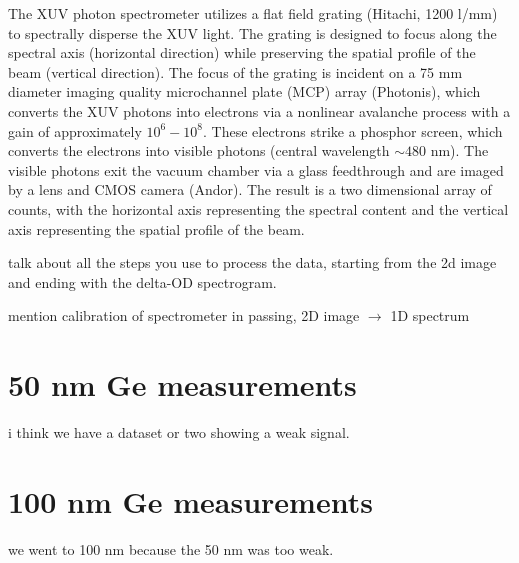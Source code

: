 The XUV photon spectrometer utilizes a flat field grating (Hitachi, 1200 l/mm) to spectrally disperse the XUV light. The grating is designed to focus along the spectral axis (horizontal direction) while preserving the spatial profile of the beam (vertical direction). The focus of the grating is incident on a 75 mm diameter imaging quality microchannel plate (MCP) array (Photonis), which converts the XUV photons into electrons via a nonlinear avalanche process with a gain of approximately $10^6 - 10^8$. These electrons strike a phosphor screen, which converts the electrons into visible photons (central wavelength $\sim480$ nm). The visible photons exit the vacuum chamber via a glass feedthrough and are imaged by a lens and CMOS camera (Andor). The result is a two dimensional array of counts, with the horizontal axis representing the spectral content and the vertical axis representing the spatial profile of the beam.

talk about all the steps you use to process the data, starting from the 2d image and ending with the delta-OD spectrogram.

mention calibration of spectrometer in passing, 2D image $\rightarrow$ 1D spectrum


\section{50 nm Ge measurements}
i think we have a dataset or two showing a weak signal.


\section{100 nm Ge measurements}
we went to 100 nm because the 50 nm was too weak.
